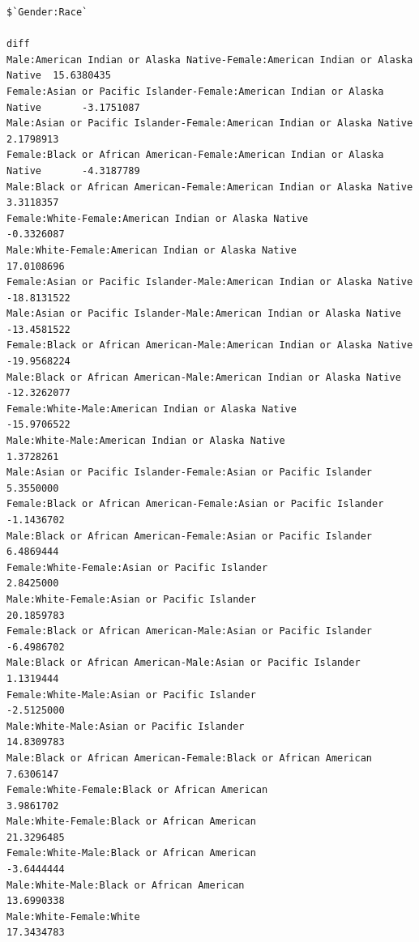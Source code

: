 \documentclass[
  letterpaper,
  DIV=11,
  numbers=noendperiod]{scrartcl}
\begin{document}
\begin{verbatim}
$`Gender:Race`
                                                                                     diff
Male:American Indian or Alaska Native-Female:American Indian or Alaska Native  15.6380435
Female:Asian or Pacific Islander-Female:American Indian or Alaska Native       -3.1751087
Male:Asian or Pacific Islander-Female:American Indian or Alaska Native          2.1798913
Female:Black or African American-Female:American Indian or Alaska Native       -4.3187789
Male:Black or African American-Female:American Indian or Alaska Native          3.3118357
Female:White-Female:American Indian or Alaska Native                           -0.3326087
Male:White-Female:American Indian or Alaska Native                             17.0108696
Female:Asian or Pacific Islander-Male:American Indian or Alaska Native        -18.8131522
Male:Asian or Pacific Islander-Male:American Indian or Alaska Native          -13.4581522
Female:Black or African American-Male:American Indian or Alaska Native        -19.9568224
Male:Black or African American-Male:American Indian or Alaska Native          -12.3262077
Female:White-Male:American Indian or Alaska Native                            -15.9706522
Male:White-Male:American Indian or Alaska Native                                1.3728261
Male:Asian or Pacific Islander-Female:Asian or Pacific Islander                 5.3550000
Female:Black or African American-Female:Asian or Pacific Islander              -1.1436702
Male:Black or African American-Female:Asian or Pacific Islander                 6.4869444
Female:White-Female:Asian or Pacific Islander                                   2.8425000
Male:White-Female:Asian or Pacific Islander                                    20.1859783
Female:Black or African American-Male:Asian or Pacific Islander                -6.4986702
Male:Black or African American-Male:Asian or Pacific Islander                   1.1319444
Female:White-Male:Asian or Pacific Islander                                    -2.5125000
Male:White-Male:Asian or Pacific Islander                                      14.8309783
Male:Black or African American-Female:Black or African American                 7.6306147
Female:White-Female:Black or African American                                   3.9861702
Male:White-Female:Black or African American                                    21.3296485
Female:White-Male:Black or African American                                    -3.6444444
Male:White-Male:Black or African American                                      13.6990338
Male:White-Female:White                                                        17.3434783

\end{verbatim}
\end{document}
